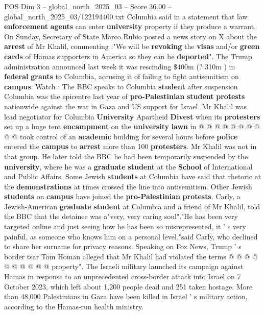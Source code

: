 \begin{textsample}{POS Dim 3 – global\_north\_2025\_03 – Score 36.00 – global\_north\_2025\_03/122194400.txt}
Columbia said in a statement that law \textbf{enforcement} \textbf{agents} can enter \textbf{university} property if they produce a warrant.
On Sunday, Secretary of State Marco Rubio posted a news story on X about the \textbf{arrest} of Mr Khalil, commenting :"We will be \textbf{revoking} the \textbf{visas} and/or \textbf{green} \textbf{cards} of Hamas supporters in America so they can be \textbf{deported}".
The Trump administration announced last week it was rescinding \$400m (? 310m ) in \textbf{federal} \textbf{grants} to Columbia, accusing it of failing to fight antisemitism on \textbf{campus}.
Watch : The BBC speaks to Columbia \textbf{student} after suspension Columbia was the epicentre last year of \textbf{pro-Palestinian} \textbf{student} \textbf{protests} nationwide against the war in Gaza and US support for Israel.
Mr Khalil was lead negotiator for Columbia \textbf{University} Apartheid \textbf{Divest} when its \textbf{protesters} set up a huge tent \textbf{encampment} on the \textbf{university} \textbf{lawn} in @ @ @ @ @ @ @ @ @ @ took control of an \textbf{academic} building for several hours before \textbf{police} entered the \textbf{campus} to \textbf{arrest} more than 100 \textbf{protesters}.
Mr Khalil was not in that group.
He later told the BBC he had been temporarily suspended by the \textbf{university}, where he was a \textbf{graduate} \textbf{student} at the \textbf{School} of International and Public Affairs.
Some Jewish \textbf{students} at Columbia have said that rhetoric at the \textbf{demonstrations} at times crossed the line into antisemitism.
Other Jewish \textbf{students} on \textbf{campus} have joined the \textbf{pro-Palestinian} \textbf{protests}.
Carly, a Jewish-American \textbf{graduate} \textbf{student} at Columbia and a friend of Mr Khalil, told the BBC that the detainee was a"very, very caring soul"."He has been very targeted online and just seeing how he has been so misrepresented, it ' s very painful, as someone who knows him on a personal level,"said Carly, who declined to share her surname for privacy reasons.
Speaking on Fox News, Trump ' s border tsar Tom Homan alleged that Mr Khalil had violated the terms @ @ @ @ @ @ @ @ @ @ property".
The Israeli military launched its campaign against Hamas in response to an unprecedented cross-border attack into Israel on 7 October 2023, which left about 1,200 people dead and 251 taken hostage.
More than 48,000 Palestinians in Gaza have been killed in Israel ' s military action, according to the Hamas-run health ministry.

\end{textsample}
